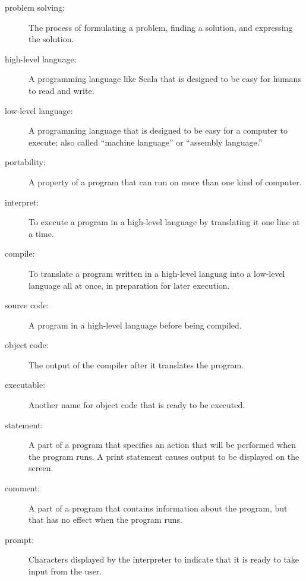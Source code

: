 \documentclass[10pt]{book}
\begin{document}
\begin{description}

\item[problem solving:]  The process of formulating a problem, finding a solution, and expressing the solution.

\item[high-level language:]  A programming language like Scala that is designed to be easy for humans to read and write.

\item[low-level language:]  A programming language that is designed to be easy for a computer to execute; also called ``machine language'' or ``assembly language.''

\item[portability:]  A property of a program that can run on more than one kind of computer.

\item[interpret:]  To execute a program in a high-level language by translating it one line at a time.

\item[compile:]  To translate a program written in a high-level languag into a low-level language all at once, in preparation for later execution.

\item[source code:]  A program in a high-level language before being compiled.

\item[object code:]  The output of the compiler after it translates the program.

\item[executable:]  Another name for object code that is ready to be executed.

\item[statement:] A part of a program that specifies an action
that will be performed when the program runs.  A print statement
causes output to be displayed on the screen.

\item[comment:] A part of a program that contains information
about the program, but that has no effect when the program runs.

\item[prompt:] Characters displayed by the interpreter to indicate that it is ready to take input from the user.


\end{description}
\end{document}
